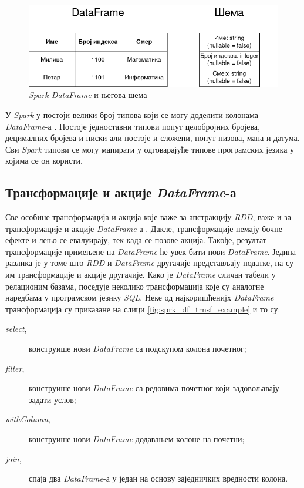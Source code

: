 \documentclass[12pt,oneside]{memoir}
\begin{document}
\begin{figure}[!ht]
  \centering
  \includegraphics[width=1\textwidth]{pictures/dataframe_schema.png}
  \caption{\textit{Spark DataFrame} и његова шема}
  \label{fig:sprk_df_schema_example}
\end{figure}

У \textit{Spark}-у постоји велики број типова који се могу доделити колонама \textit{DataFrame}-а \cite{spark_guide}. Постоје једноставни типови попут целобројних бројева, децималних бројева и ниски али постоје и сложени, попут низова, мапа и датума. Сви \textit{Spark} типови се могу мапирати у одговарајуће типове програмских језика у којима се он користи.

\subsection{Трансформације и акције \textit{DataFrame}-а}
\label{subsec:spark_sql_ac_tr}

Све особине трансформација и акција које важе за апстракцију \textit{RDD}, важе и за трансформације и акције \textit{DataFrame}-а \cite{spark_guide}. Дакле, трансформације немају бочне ефекте и лењо се евалуирају, тек када се позове акција. Такође, резултат трансформације примењене на \textit{DataFrame} ће увек бити нови \textit{DataFrame}. Једина разлика је у томе што \textit{RDD} и \textit{DataFrame} другачије представљају податке, па су им трансформације и акције другачије. Како је \textit{DataFrame} сличан табели у релационим базама, поседује неколико трансформација које су аналогне наредбама у програмском језику \textit{SQL}. Неке од најкоришћенијх \textit{DataFrame} трансформација су приказане на слици \ref{fig:sprk_df_trnsf_example} и то су:

\begin{description} 
	\item[\textit{select},] конструише нови \textit{DataFrame} са подскупом колона почетног;
	\item[\textit{filter},] конструише нови \textit{DataFrame} са редовима почетног који задовољавају задати услов;
	\item[\textit{withColumn},] конструише нови \textit{DataFrame} додавањем колоне на почетни;
		\item[\textit{join},] спаја два \textit{DataFrame}-а у један на основу заједничких вредности колона.
\end{description}
\end{document}
